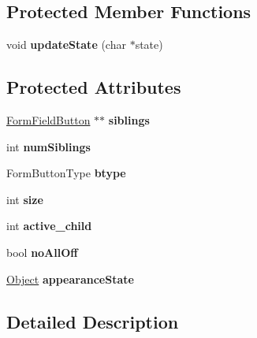 \subsection*{Protected Member Functions}
\begin{DoxyCompactItemize}
\item 
\mbox{\label{class_form_field_button_a22c918c0d62bb7c3e94eb967942c4f24}} 
void {\bfseries update\+State} (char $\ast$state)
\end{DoxyCompactItemize}
\subsection*{Protected Attributes}
\begin{DoxyCompactItemize}
\item 
\mbox{\label{class_form_field_button_a50c1cc5669b30f4c913668b3d5ab9f16}} 
\hyperlink{class_form_field_button}{Form\+Field\+Button} $\ast$$\ast$ {\bfseries siblings}
\item 
\mbox{\label{class_form_field_button_ac21d5e5b2c176d127b1f1ef13a5fdf97}} 
int {\bfseries num\+Siblings}
\item 
\mbox{\label{class_form_field_button_a8235b171c033307e82f7b59a4447bf60}} 
Form\+Button\+Type {\bfseries btype}
\item 
\mbox{\label{class_form_field_button_ad6680166eb1077005a314aa217c64a36}} 
int {\bfseries size}
\item 
\mbox{\label{class_form_field_button_a963381fb1ac7fe92c62a67ae45b90dd4}} 
int {\bfseries active\+\_\+child}
\item 
\mbox{\label{class_form_field_button_ad123fc5cc2ed621f431dc0c88d8a4a99}} 
bool {\bfseries no\+All\+Off}
\item 
\mbox{\label{class_form_field_button_a702aaf50b31e14473477edbb773bf71e}} 
\hyperlink{class_object}{Object} {\bfseries appearance\+State}
\end{DoxyCompactItemize}


\subsection{Detailed Description}


